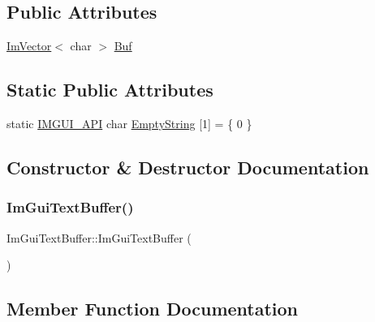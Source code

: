 \subsection*{Public Attributes}
\begin{DoxyCompactItemize}
\item 
\hyperlink{structImVector}{Im\+Vector}$<$ char $>$ \hyperlink{structImGuiTextBuffer_aa6de034b1920cdae5505cc58abf14240}{Buf}
\end{DoxyCompactItemize}
\subsection*{Static Public Attributes}
\begin{DoxyCompactItemize}
\item 
static \hyperlink{imgui_8h_a43829975e84e45d1149597467a14bbf5}{I\+M\+G\+U\+I\+\_\+\+A\+PI} char \hyperlink{structImGuiTextBuffer_a471f810a368ec5f4a8ee12c407330c35}{Empty\+String} \mbox{[}1\mbox{]} = \{ 0 \}
\end{DoxyCompactItemize}


\subsection{Constructor \& Destructor Documentation}
\mbox{\label{structImGuiTextBuffer_a4c4369c5e65f591554428b947c498d0d}} 
\subsubsection{\texorpdfstring{Im\+Gui\+Text\+Buffer()}{ImGuiTextBuffer()}}
{\footnotesize\ttfamily Im\+Gui\+Text\+Buffer\+::\+Im\+Gui\+Text\+Buffer (\begin{DoxyParamCaption}{ }\end{DoxyParamCaption})\hspace{0.3cm}{\ttfamily [inline]}}



\subsection{Member Function Documentation}
\mbox{\label{structImGuiTextBuffer_a9101840866a9e5408ea1e25a779a40dc}} 
